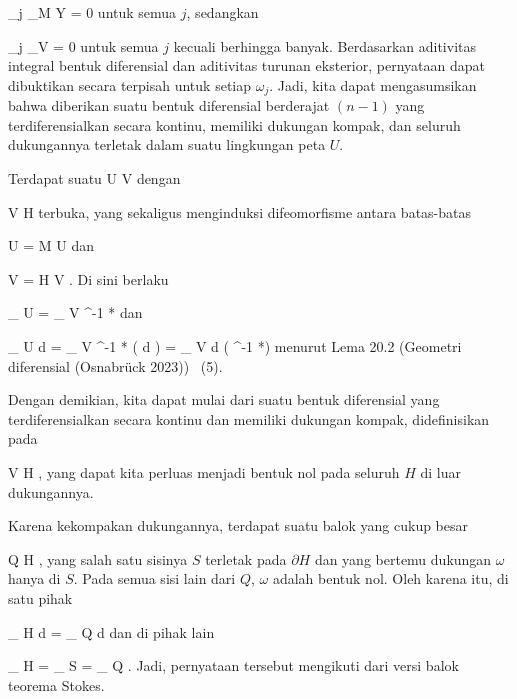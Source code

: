 {{\mavergleichskette
{\vergleichskette
{ \omega_j \vert_{M \setminus Y}
}
{ = }{ 0
}
{  }{
}
{    }{
}
{   }{
}
}
{}{}{}
untuk semua $j$, sedangkan

\mavergleichskettedisp
{\vergleichskette
{ \omega_j \vert_V
}
{ =} { 0
}
{ } {
}
{ } {
}
{ } {
}
}
{}{}{}
untuk semua $j$ kecuali berhingga banyak. Berdasarkan
aditivitas integral bentuk diferensial
dan
aditivitas turunan eksterior,
pernyataan dapat dibuktikan secara terpisah untuk setiap $\omega_j$. Jadi, kita dapat mengasumsikan bahwa diberikan suatu bentuk diferensial berderajat $(n-1)$ yang terdiferensialkan secara kontinu, memiliki dukungan kompak, dan seluruh dukungannya terletak dalam suatu lingkungan peta $U$.}
{}
\teilbeweis {}{}{}
{Terdapat suatu
\maabb {\alpha} { U } { V
} {}
dengan

\mavergleichskette
{\vergleichskette
{ V
}
{ \subseteq }{ H
}
{  }{
}
{    }{
}
{   }{
}
}
{}{}{}
terbuka, yang sekaligus menginduksi difeomorfisme antara batas-batas

\mavergleichskette
{\vergleichskette
{ \partial U
}
{ = }{ \partial M \cap U
}
{  }{
}
{    }{
}
{   }{
}
}
{}{}{}
dan

\mavergleichskette
{\vergleichskette
{ \partial V
}
{ = }{ \partial H \cap V
}
{  }{
}
{    }{
}
{   }{
}
}
{}{}{}.
Di sini berlaku

\mavergleichskettedisp
{\vergleichskette
{
\int_{  \partial U  }   \omega
}
{ =} {
\int_{  \partial V  }  \alpha^{-1 *}\omega
}
{ } {
}
{ } {
}
{ } {
}
}
{}{}{}
dan

\mavergleichskettedisp
{\vergleichskette
{
\int_{ U  }  d \omega
}
{ =} {
\int_{ V  }  \alpha^{-1 *} (  d \omega)
}
{ =} {
\int_{  V  }  d \left(  \alpha^{-1 *}\omega  \right)
}
{ } {
}
{ } {
}
}
{}{}{}
menurut
Lema 20.2 (Geometri diferensial (Osnabrück 2023))  (5).}
{\leerzeichen{}Dengan demikian, kita dapat mulai dari suatu bentuk diferensial yang terdiferensialkan secara kontinu dan memiliki dukungan kompak, didefinisikan pada

\mavergleichskette
{\vergleichskette
{ V
}
{ \subseteq }{ H
}
{  }{
}
{    }{
}
{   }{
}
}
{}{}{},
yang dapat kita perluas menjadi bentuk nol pada seluruh $H$ di luar dukungannya.}
\teilbeweis {}{}{}
{Karena kekompakan dukungannya, terdapat suatu balok yang cukup besar

\mavergleichskette
{\vergleichskette
{ Q
}
{ \subseteq }{ H
}
{  }{
}
{    }{
}
{   }{
}
}
{}{}{,}
yang salah satu sisinya $S$ terletak pada $\partial H$ dan yang bertemu dukungan $\omega$ hanya di $S$. Pada semua sisi lain dari $Q$, $\omega$
 {} {}
adalah bentuk nol. Oleh karena itu, di satu pihak

\mavergleichskettedisp
{\vergleichskette
{
\int_{ H  }  d\omega
}
{ =} {
\int_{ Q  }  d\omega
}
{ } {
}
{ } {
}
{ } {
}
}
{}{}{}
dan di pihak lain

\mavergleichskettedisp
{\vergleichskette
{
\int_{  \partial H  }   \omega
}
{ =} {
\int_{  S  }   \omega
}
{ =} {
\int_{  \partial Q  }   \omega
}
{ } {
}
{ } {
}
}
{}{}{.}
Jadi, pernyataan tersebut mengikuti dari versi balok teorema Stokes.}
{}

}



